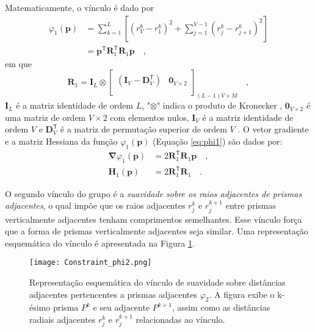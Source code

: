 Matematicamente, o vínculo é dado por \begin{equation}\label{eq:phi1}
\begin{split}
\varphi_{1}(\mathbf{p}) &= \sum\limits^{L}_{k=1}\left[\left(r^{k}_{V}-r^{k}_{1}\right)^2 + \sum\limits^{V-1}_{j=1}\left(r^{k}_{j}-r^{k}_{j+1}\right)^2\right]\\
&= \mathbf{p}^{\mathsf{T}} \mathbf{R}^{\mathsf{T}}_{1}\mathbf{R}_{1} \mathbf{p} \quad ,
\end{split}
\end{equation}
em que
\begin{equation}
\mathbf{R}_{1} = 
\mathbf{I}_{L} \otimes 
\begin{bmatrix}
\left( \mathbf{I}_{V} - \mathbf{D}_{V}^\mathsf{T} \right) & \mathbf{0}_{V \times 2} \\
\end{bmatrix}_{(L-1)V \times M} \quad ,
\label{eq:S1-matrix}
\end{equation}
$\mathbf{I}_{L}$ é a matriz identidade de ordem $L$, "$\otimes$" indica o produto de Kronecker \cite{}\cite[][ p. 243]{horn_johnson1991}, $\mathbf{0}_{V \times 2}$ é uma matriz de ordem $V \times 2$ com elementos nulos, 
$\mathbf{I}_{V}$ é a matriz identidade de ordem $V$ e $\mathbf{D}_{V}^\mathsf{T}$ é a matriz de permutação superior de ordem $V$ \cite[][ p. 20]{golub-vanloan2013}. O vetor gradiente e a matriz Hessiana da função $\varphi_{1}(\mathbf{p})$ (Equação \ref{eq:phi1}) são dados por:
\begin{equation}\label{eq:phi1_gh}
\begin{split}
\boldsymbol{\nabla}\varphi_{1}(\mathbf{p}) &= 2 \mathbf{R}^\mathsf{T}_{1}\mathbf{R}_{1}\mathbf{p} \quad , \\
\mathbf{H}_{1}(\mathbf{p}) &= 2\mathbf{R}^\mathsf{T}_{1}\mathbf{R}_{1} \quad .
\end{split}
\end{equation}

O segundo vínculo do grupo é a \textit{suavidade sobre os raios adjacentes de prismas adjacentes}, o qual impõe que os raios adjacentes $r_{j}^{k}$ e $r_{j}^{k+1}$ entre prismas verticalmente adjacentes tenham comprimentos semelhantes. Esse vínculo força que a forma de prismas verticalmente adjacentes seja similar. Uma representação esquemática do vínculo é apresentada na Figura \ref{fig:phi2}.

\begin{figure}[!htb]
	\centering
	\texttt{[image: Constraint\_phi2.png]}
	\caption{Representação esquemática do vínculo de suavidade sobre distâncias adjacentes pertencentes a prismas adjacentes $\varphi_{2}$. A figura exibe o k-ésimo prisma $P^k$ e seu adjacente $P^{k+1}$, assim como as distâncias radiais adjacentes $r_j^k$ e $r_j^{k+1}$ relacionadas ao vínculo.}
	\label{fig:phi2}
\end{figure}

